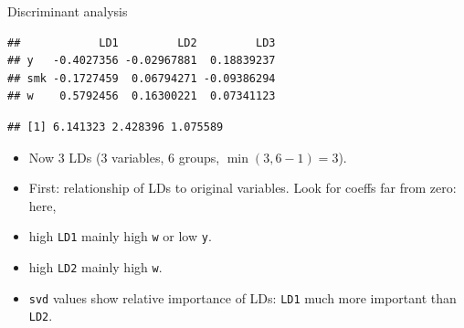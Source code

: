 \documentclass[ignorenonframetext,]{beamer}
\newenvironment{Shaded}{\begin{snugshade}}{\end{snugshade}}
\newcommand{\DataTypeTok}[1]{\textcolor[rgb]{0.13,0.29,0.53}{#1}}
\newcommand{\FloatTok}[1]{\textcolor[rgb]{0.00,0.00,0.81}{#1}}
\newcommand{\KeywordTok}[1]{\textcolor[rgb]{0.13,0.29,0.53}{\textbf{#1}}}
\newcommand{\NormalTok}[1]{#1}
\newcommand{\OperatorTok}[1]{\textcolor[rgb]{0.81,0.36,0.00}{\textbf{#1}}}
\newcommand{\StringTok}[1]{\textcolor[rgb]{0.31,0.60,0.02}{#1}}
\begin{document}
\begin{frame}[fragile]{Discriminant analysis}
\protect\hypertarget{discriminant-analysis-2}{}

\begin{Shaded}
\end{Shaded}

\begin{verbatim}
##            LD1         LD2         LD3
## y   -0.4027356 -0.02967881  0.18839237
## smk -0.1727459  0.06794271 -0.09386294
## w    0.5792456  0.16300221  0.07341123
\end{verbatim}

\begin{Shaded}
\end{Shaded}

\begin{verbatim}
## [1] 6.141323 2.428396 1.075589
\end{verbatim}

\begin{itemize}
\item
  Now 3 LDs (3 variables, 6 groups, \(\min(3,6-1)=3\)).
\item
  First: relationship of LDs to original variables. Look for coeffs far
  from zero: here,
\item
  high \texttt{LD1} mainly high \texttt{w} or low \texttt{y}.
\item
  high \texttt{LD2} mainly high \texttt{w}.
\item
  \texttt{svd} values show relative importance of LDs: \texttt{LD1} much
  more important than \texttt{LD2}.
\end{itemize}

\end{frame}
\end{document}
